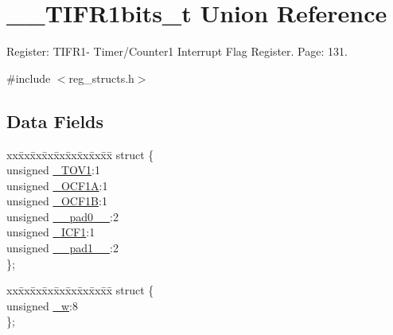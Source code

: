 \hypertarget{union_____t_i_f_r1bits__t}{\section{\+\_\+\+\_\+\+T\+I\+F\+R1bits\+\_\+t Union Reference}
\label{union_____t_i_f_r1bits__t}
}


Register\+: T\+I\+F\+R1-\/ Timer/\+Counter1 Interrupt Flag Register. Page\+: 131.  




{\ttfamily \#include $<$reg\+\_\+structs.\+h$>$}

\subsection*{Data Fields}
\begin{DoxyCompactItemize}
\item 
\begin{tabbing}
xx\=xx\=xx\=xx\=xx\=xx\=xx\=xx\=xx\=\kill
struct \{\\
\>unsigned \hyperlink{union_____t_i_f_r1bits__t_ad73c5e16fb3c89b277c98dffff196150}{\_TOV1}:1\\
\>unsigned \hyperlink{union_____t_i_f_r1bits__t_aadeab388893a208b9f9edab5b4636a83}{\_OCF1A}:1\\
\>unsigned \hyperlink{union_____t_i_f_r1bits__t_abd991cb0c124d213eb5b695a367e20b3}{\_OCF1B}:1\\
\>unsigned \hyperlink{union_____t_i_f_r1bits__t_a5b9b27ff6d2a5313311e2e89ef07c466}{\_\_pad0\_\_}:2\\
\>unsigned \hyperlink{union_____t_i_f_r1bits__t_accb348df81834691abc7e69761bfd8a7}{\_ICF1}:1\\
\>unsigned \hyperlink{union_____t_i_f_r1bits__t_ad2d26dfffd8d2cbbc70778514e0dc787}{\_\_pad1\_\_}:2\\
\}; \\

\end{tabbing}\item 
\begin{tabbing}
xx\=xx\=xx\=xx\=xx\=xx\=xx\=xx\=xx\=\kill
struct \{\\
\>unsigned \hyperlink{union_____t_i_f_r1bits__t_a3e0ab1c1af805293eee68527df229f38}{\_w}:8\\
\}; \\

\end{tabbing}\end{DoxyCompactItemize}


